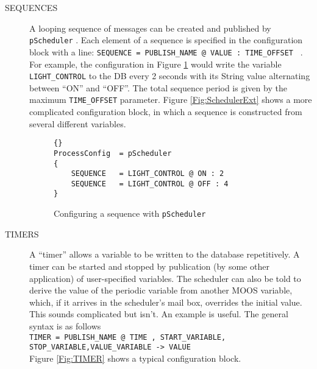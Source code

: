 \documentclass[a4paper,10pt]{article}
\newcommand{\Code}[1]{\texttt{#1} }
\newcommand{\code}[1]{\Code{#1} }
\begin{document}
\begin{description}
\item[SEQUENCES] A looping sequence of messages can be created and published by \code{pScheduler}. Each element of a
sequence is specified in the configuration block  with a line:
\code{SEQUENCE = PUBLISH\_NAME @ VALUE : TIME\_OFFSET }. For
example, the configuration in Figure \ref{Fig:Sequences} would
write the variable \code{LIGHT\_CONTROL} to the DB every 2 seconds
with its String value alternating between ``ON'' and ``OFF''. The
total sequence period is given by the maximum \code{TIME\_OFFSET}
parameter. Figure \ref{Fig:SchedulerExt} shows a more complicated
configuration block, in which a sequence is constructed from
several different variables.
\begin{figure}[ht]

\begin{lstlisting}[]{}
ProcessConfig  = pScheduler
{
    SEQUENCE   = LIGHT_CONTROL @ ON : 2
    SEQUENCE   = LIGHT_CONTROL @ OFF : 4
}
\end{lstlisting}\caption{Configuring a sequence with \code{pScheduler}}
\label{Fig:Sequences}
\end{figure}
\item[TIMERS] A ``timer'' allows a variable to be written to the
database repetitively. A timer can be started and stopped by
publication (by some other application) of user-specified
variables. The scheduler can also be told  to derive the  value of
the periodic variable from another MOOS variable, which, if it
arrives in the scheduler's mail box, overrides the initial value.
This sounds complicated but isn't. An example is useful. The
general syntax is as follows\\
\code{TIMER = PUBLISH\_NAME @ TIME , START\_VARIABLE,
STOP\_VARIABLE,VALUE\_VARIABLE -> VALUE}\\
Figure \ref{Fig:TIMER} shows a typical configuration block.
\begin{figure}[ht]


\end{figure}
\end{description}
\end{document}
